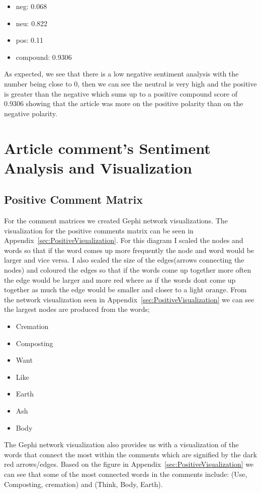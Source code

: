 \documentclass{article}
\begin{document}
\begin{itemize}
    \item neg: 0.068
    \item neu: 0.822
    \item pos: 0.11
    \item compound: 0.9306
\end{itemize}
As expected, we see that there is a low negative sentiment analysis with the number being close to 0, then we can see the neutral is very high and the positive is greater than the negative which sums up to a positive compound score of 0.9306 showing that the article was more on the positive polarity than on the negative polarity.

\section{Article comment's Sentiment Analysis and Visualization}

\subsection{Positive Comment Matrix}

For the comment matrices we created Gephi network visualizations. The visualization for the positive comments matrix can be seen in Appendix~\ref{sec:PositiveVisualization}. For this diagram I scaled the nodes and words so that if the word comes up more frequently the node and word would be larger and vice versa. I also scaled the size of the edges(arrows connecting the nodes) and coloured the edges so that if the words come up together more often the edge would be larger and more red where as if the words dont come up together as much the edge would be smaller and closer to a light orange. From the network visualization seen in Appendix~\ref{sec:PositiveVisualization} we can see the largest nodes are produced from the words;

\begin{itemize}
    \item Cremation
    \item Composting
    \item Want
    \item Like
    \item Earth
    \item Ash
    \item Body
\end{itemize}

The Gephi network visualization also provides us with a visualization of the words that connect the most within the comments which are signified by the dark red arrows/edges. Based on the figure in Appendix~\ref{sec:PositiveVisualization} we can see that some of the most connected words in the comments include: (Use, Composting, cremation) and (Think, Body, Earth). 
\end{document}
